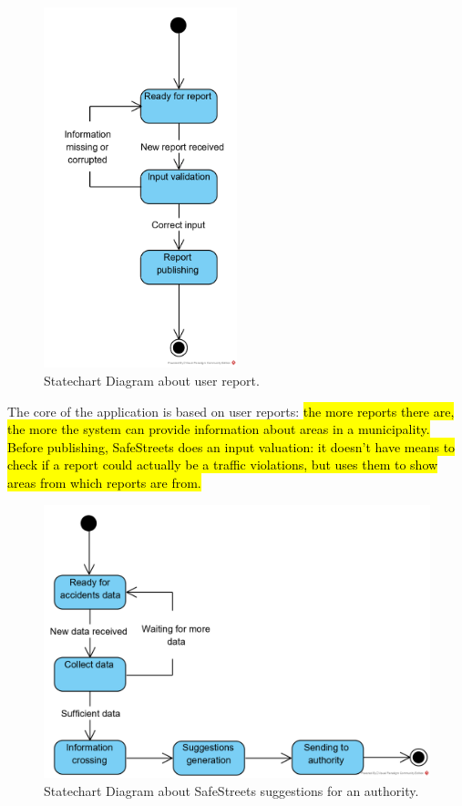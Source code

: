 \documentclass{article}
\begin{document}
			\begin{figure}[H]
				\centering
				\includegraphics[width=0.5\textwidth]{diagrams/statechart_UserSS.png}
				\caption[Statechart Diagram1]{Statechart Diagram about user report.}
				\label{fig:statechart_userReporting}
			\end{figure}
			
			The core of the application is based on user reports: \hl{the more reports there are, the more the system can provide information about areas in a municipality. Before publishing, SafeStreets does an input valuation: it doesn't have means to check if a report could actually be a traffic violations, but uses them to show areas from which reports are from.}
			
			\begin{figure}[H]
				\centering
				\includegraphics {diagrams/statechart_AuthoritySS.png}
				\caption[Statechart Diagram2]{Statechart Diagram about SafeStreets suggestions for an authority.}
				\label{fig:statechart_SuggestionsForAuthority}
			\end{figure}
			
\end{document}
